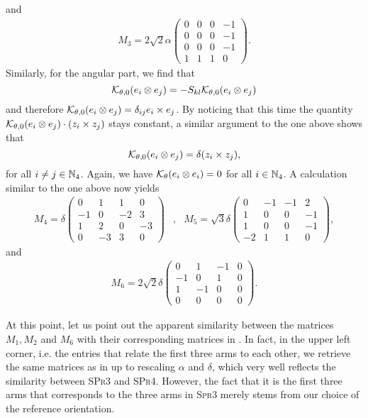 and
\begin{align}
\label{eq: M3}
M_3 = 2 \sqrt{2} \alpha \left (
\begin{array}{cccc}
0 & 0 & 0 & -1 \\ 
0 & 0 & 0 & -1 \\ 
0 & 0 & 0 & -1 \\ 
1 & 1 & 1 & 0
\end{array} 
\right ).
\end{align}
Similarly, for the angular part, we find that
\begin{equation}
	\mathcal{K}_{\theta, 0}(e_i \otimes e_j) = - S_{kl} \mathcal{K}_{\theta,0}(e_i \otimes e_j)
\end{equation}
and therefore $\mathcal{K}_{\theta,0}(e_i \otimes e_j) = \delta_{ij} e_i \times e_j$. By noticing that this time the quantity $\mathcal{K}_{\theta,0}(e_i \otimes e_j) \cdot (z_i \times z_j)$ stays constant, a similar argument to the one above shows that
\begin{equation}
\mathcal{K}_{\theta,0}(e_i \otimes e_j) = \delta (z_i \times z_j),
\end{equation}
for all $i \neq j \in \mathbb{N}_4$. Again, we have $\mathcal{K}_{\theta}(e_i \otimes e_i) = 0$ for all $i \in \mathbb{N}_4$. A calculation similar to the one above now yields
\begin{align}
\label{eq: M4 and M5}
	M_4 = \delta \left (
	\begin{array}{cccc}
	0 & 1 & 1 & 0 \\ 
	-1 & 0 & -2 & 3 \\ 
	1 & 2 & 0 & -3 \\ 
	0 & -3 & 3 & 0
	\end{array} 
	\right ) &, & M_5 = \sqrt{3} \delta \left ( \begin{array}{cccc}
	0 & -1 & -1 & 2 \\ 
	1 & 0 & 0 & -1 \\ 
	1 & 0 & 0 & -1 \\ 
	-2 & 1 & 1 & 0
	\end{array} \right ) ,
\end{align}
and
\begin{align}
\label{eq: M6}
M_6 = 2 \sqrt{2} \delta \left (\begin{array}{cccc}
0 & 1 & -1 & 0 \\ 
-1 & 0 & 1 & 0 \\ 
1 & -1 & 0 & 0 \\ 
0 & 0 & 0 & 0
\end{array}  \right ).
\end{align}

\begin{remark}
At this point, let us point out the apparent similarity between the matrices $M_1, M_2$ and $M_6$ with their corresponding matrices in \cite{Alouges2017}. In fact, in the upper left corner, i.e. the entries that relate the first three arms to each other, we retrieve the same matrices as in \cite{Alouges2017} up to rescaling $\alpha$ and $\delta$, which very well reflects the similarity between \textsc{SPr3} and \textsc{SPr4}. However, the fact that it is the first three arms that corresponds to the three arms in \textsc{Spr3} merely stems from our choice of the reference orientation.
\end{remark}

